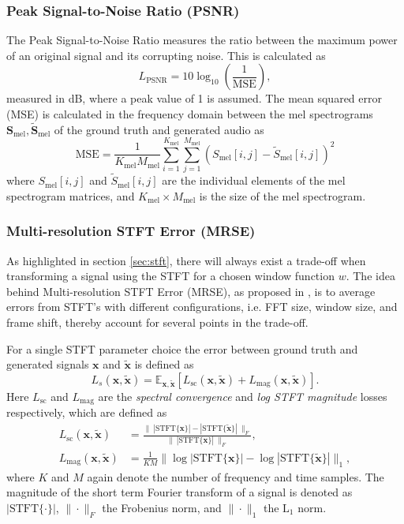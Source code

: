 \documentclass{article}
\begin{document}
\subsubsection{Peak Signal-to-Noise Ratio (PSNR)}

The Peak Signal-to-Noise Ratio measures the ratio between the maximum power of an original signal and its corrupting noise. This is calculated as 
\begin{equation}
    L_{\text{PSNR}} = 10 \log_{10}\left(\frac{1}{\text{MSE}}\right),
\end{equation}
measured in dB, where a peak value of 1 is assumed. The mean squared error (MSE) is calculated in the frequency domain between the mel spectrograms $\bm{S}_{\text{mel}}, \tilde{\bm{S}}_{\text{mel}}$ of the ground truth and generated audio as
\begin{equation}
    \text{MSE} = \frac{1}{K_{\text{mel}}M_{\text{mel}}}\sum_{i=1}^{K_{\text{mel}}} \sum_{j=1}^{M_{\text{mel}}} \left( S_{\text{mel}}[i, j] - \tilde{S}_{\text{mel}}[i,j] \right)^2
\end{equation}
where $S_{\text{mel}}[i, j]$ and $\tilde{S}_{\text{mel}}[i,j]$ are the individual elements of the mel spectrogram matrices, and $K_{\text{mel}} \times M_{\text{mel}}$ is the size of the mel spectrogram.


\subsubsection{Multi-resolution STFT Error (MRSE)}
As highlighted in section \ref{sec:stft}, there will always exist a trade-off when transforming a signal using the STFT for a chosen window function $w$. The idea behind Multi-resolution STFT Error (MRSE), as proposed in \cite{yamamoto2020parallel}, is to average errors from STFT's with different configurations, i.e. FFT size, window size, and frame shift, thereby account for several points in the trade-off.

For a single STFT parameter choice the error between ground truth and generated signals $\bm{x}$ and $\tilde{\bm{x}}$ is defined as
\begin{equation}
    L_s(\bm{x}, \tilde{\bm{x}}) = \mathbb{E}_{\bm{x}, \tilde{\bm{x}}} [L_{\text{sc}}(\bm{x}, \tilde{\bm{x}}) + L_{\text{mag}}(\bm{x}, \tilde{\bm{x}})].
\end{equation}
Here $L_{\text{sc}}$ and $L_{\text{mag}}$ are the \textit{spectral convergence} and \textit{log STFT magnitude} losses respectively, which are defined as
\begin{align}
    L_{\text{sc}}(\bm{x}, \tilde{\bm{x}}) &= \frac{\| \ |\text{STFT}\{\bm{x}\} | - | \text{STFT}\{\tilde{\bm{x}}\}| \ \|_F}{\| \ | \text{STFT}\{\bm{x}\} | \ \|_F}, \\
    L_{\text{mag}}(\bm{x}, \tilde{\bm{x}}) &= \frac{1}{KM} \| \log{| \text{STFT}\{\bm{x}\} | } - \log{| \text{STFT}\{\tilde{\bm{x}}\} |} \|_1,
\end{align}
where $K$ and $M$ again denote the number of frequency and time samples. The magnitude of the short term Fourier transform of a signal is denoted as $|\text{STFT}\{\cdot\}|$, $\|\cdot \|_F$ the Frobenius norm, and $\|\cdot\|_1$ the $\text{L}_1$ norm.
\end{document}
